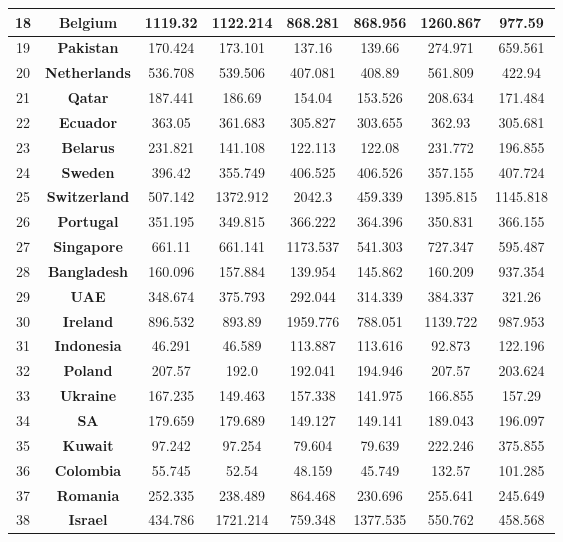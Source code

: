 \begin{table*}
\begin{center}
\begin{tiny}
\begin{tabular}{|c|c|c|c|c|c|c|c|}
18 & {\bf Belgium} & 1119.32 & 1122.214 & 868.281 & 868.956 & 1260.867 & 977.59\\ \hline
19 & {\bf Pakistan} & 170.424 & 173.101 & 137.16 & 139.66 & 274.971 & 659.561\\ \hline
20 & {\bf Netherlands} & 536.708 & 539.506 & 407.081 & 408.89 & 561.809 & 422.94\\ \hline
21 & {\bf Qatar} & 187.441 & 186.69 & 154.04 & 153.526 & 208.634 & 171.484\\ \hline
22 & {\bf Ecuador} & 363.05 & 361.683 & 305.827 & 303.655 & 362.93 & 305.681\\ \hline
23 & {\bf Belarus} & 231.821 & 141.108 & 122.113 & 122.08 & 231.772 & 196.855\\ \hline
24 & {\bf Sweden} & 396.42 & 355.749 & 406.525 & 406.526 & 357.155 & 407.724\\ \hline
25 & {\bf Switzerland} & 507.142 & 1372.912 & 2042.3 & 459.339 & 1395.815 & 1145.818\\ \hline
26 & {\bf Portugal} & 351.195 & 349.815 & 366.222 & 364.396 & 350.831 & 366.155\\ \hline
27 & {\bf Singapore} & 661.11 & 661.141 & 1173.537 & 541.303 & 727.347 & 595.487\\ \hline
28 & {\bf Bangladesh} & 160.096 & 157.884 & 139.954 & 145.862 & 160.209 & 937.354\\ \hline
29 & {\bf UAE} & 348.674 & 375.793 & 292.044 & 314.339 & 384.337 & 321.26\\ \hline
30 & {\bf Ireland} & 896.532 & 893.89 & 1959.776 & 788.051 & 1139.722 & 987.953\\ \hline
31 & {\bf Indonesia} & 46.291 & 46.589 & 113.887 & 113.616 & 92.873 & 122.196\\ \hline
32 & {\bf Poland} & 207.57 & 192.0 & 192.041 & 194.946 & 207.57 & 203.624\\ \hline
33 & {\bf Ukraine} & 167.235 & 149.463 & 157.338 & 141.975 & 166.855 & 157.29\\ \hline
34 & {\bf SA} & 179.659 & 179.689 & 149.127 & 149.141 & 189.043 & 196.097\\ \hline
35 & {\bf Kuwait} & 97.242 & 97.254 & 79.604 & 79.639 & 222.246 & 375.855\\ \hline
36 & {\bf Colombia} & 55.745 & 52.54 & 48.159 & 45.749 & 132.57 & 101.285\\ \hline
37 & {\bf Romania} & 252.335 & 238.489 & 864.468 & 230.696 & 255.641 & 245.649\\ \hline
38 & {\bf Israel} & 434.786 & 1721.214 & 759.348 & 1377.535 & 550.762 & 458.568\\ \hline

\end{tabular}
\end{tiny}
\end{center}
\end{table*}
